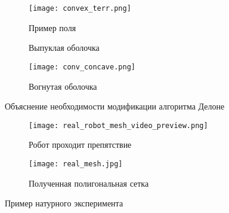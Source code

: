 \begin{figure}[h]
    \begin{subfigure}[t]{0.32\textwidth}
        \centering\texttt{[image: convex\_terr.png]}
        \caption{Пример поля}
        \label{fig:convex_terr.png}
    \end{subfigure}
    \begin{subfigure}[t]{0.32\textwidth}
        \centering
        \caption{Выпуклая оболочка}
        \label{fig:conv_convex.png}
    \end{subfigure}
    \begin{subfigure}[t]{0.32\textwidth}
        \centering\texttt{[image: conv\_concave.png]}
        \caption{Вогнутая оболочка}
        \label{fig:conv_concave.png}
    \end{subfigure}

    \caption{Объяснение необходимости модификации алгоритма Делоне}
    \label{fig:exp_concave_}
\end{figure}

\begin{figure}[ht!]
    \begin{subfigure}[t]{0.49\textwidth}
            \centering\texttt{[image: real\_robot\_mesh\_video\_preview.png]}
        \caption{Робот проходит препятствие}
        \label{fig:real_robot_mesh_video_preview.png}
    \end{subfigure}
    \begin{subfigure}[t]{0.49\textwidth}
        \centering\texttt{[image: real\_mesh.jpg]}
        \caption{Полученная полигональная сетка}
        \label{fig:real_mesh.jpg}
    \end{subfigure}
    \caption{Пример натурного эксперимента}
    \label{fig:real_exp_map_creation}
\end{figure}

